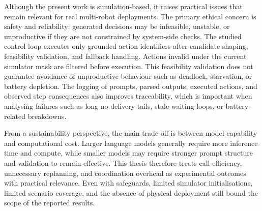 Although the present work is simulation-based, it raises practical issues that remain relevant for real multi-robot deployments.
The primary ethical concern is safety and reliability: generated decisions may be infeasible, unstable, or unproductive if they are not constrained by system-side checks.
The studied control loop executes only grounded action identifiers after candidate shaping, feasibility validation, and fallback handling.
Actions invalid under the current simulator mask are filtered before execution. This feasibility validation does not guarantee avoidance of unproductive behaviour such as deadlock, starvation, or battery depletion.
The logging of prompts, parsed outputs, executed actions, and observed step consequences also improves traceability, which is important when analysing failures such as long no-delivery tails, stale waiting loops, or battery-related breakdowns.

From a sustainability perspective, the main trade-off is between model capability and computational cost.
Larger language models generally require more inference time and compute, while smaller models may require stronger prompt structure and validation to remain effective.
This thesis therefore treats call efficiency, unnecessary replanning, and coordination overhead as experimental outcomes with practical relevance.
Even with safeguards, limited simulator initialisations, limited scenario coverage, and the absence of physical deployment still bound the scope of the reported results.
